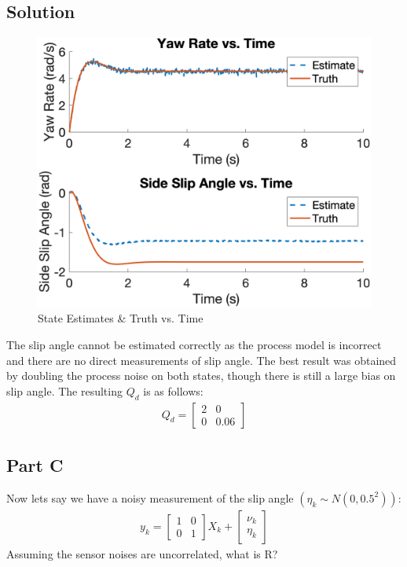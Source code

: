 \documentclass{article}
\begin{document}
\subsection*{Solution}
\begin{figure}[H]
    \centering
    \includegraphics[width=0.75\linewidth]{../figures/p4b_kf.png}
    \caption{State Estimates \& Truth vs. Time}\label{fig:p4b_kf}
\end{figure}
The slip angle cannot be estimated correctly as the process model is incorrect and there are no direct measurements of slip angle.  The best result was obtained by doubling the process noise on both states, though there is still a large bias on slip angle.  The resulting $Q_d$ is as follows:
\begin{gather*}
    Q_d = \begin{bmatrix}
        2 & 0\\
        0 & 0.06
    \end{bmatrix}
\end{gather*}

\subsection*{Part C}
Now lets say we have a noisy measurement of the slip angle $(\eta_k\sim N(0,0.5^2))$:
\begin{gather}
    y_k = \begin{bmatrix}
        1 & 0 \\
        0 & 1
    \end{bmatrix}X_k + \begin{bmatrix}
        \nu_k \\
        \eta_k
    \end{bmatrix}
\end{gather}
Assuming the sensor noises are uncorrelated, what is R?
\end{document}
